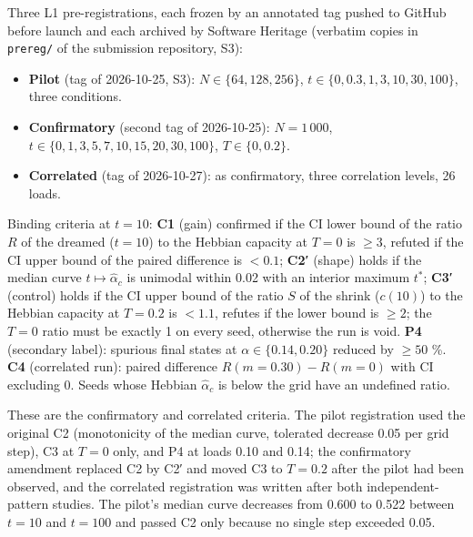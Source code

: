 Three L1 pre-registrations, each frozen by an annotated tag pushed to
GitHub before launch and each archived by Software Heritage (verbatim
copies in \texttt{prereg/} of the submission repository, S3):

\begin{itemize}
\tightlist
\item
  \textbf{Pilot} (tag of 2026-10-25, S3): \(N \in \{64, 128,
  256\}\), \(t \in \{0, 0.3, 1, 3, 10, 30, 100\}\), three conditions.
\item
  \textbf{Confirmatory} (second tag of 2026-10-25): \(N = 1\,000\),
  \(t \in \{0,\allowbreak 1,\allowbreak 3,\allowbreak 5,\allowbreak 7,\allowbreak 10,\allowbreak 15,\allowbreak 20,\allowbreak 30,\allowbreak 100\}\),
  \(T \in \{0, 0.2\}\).
\item
  \textbf{Correlated} (tag of 2026-10-27): as confirmatory, three
  correlation levels, 26 loads.
\end{itemize}

Binding criteria at \(t = 10\): \textbf{C1} (gain) confirmed if the CI
lower bound of the ratio \(R\) of the dreamed (\(t = 10\)) to the
Hebbian capacity at \(T = 0\) is \(\ge 3\), refuted if the CI upper
bound of the paired difference is \(< 0.1\); \textbf{C2′} (shape) holds
if the median curve \(t \mapsto \hat\alpha_c\) is unimodal within 0.02
with an interior maximum \(t^*\); \textbf{C3′} (control) holds if the CI
upper bound of the ratio \(S\) of the shrink (\(c(10)\)) to the Hebbian
capacity at \(T = 0.2\) is \(< 1.1\), refutes if the lower bound is
\(\ge 2\); the \(T = 0\) ratio must be exactly 1 on every seed,
otherwise the run is void. \textbf{P4} (secondary label): spurious final
states at \(\alpha \in \{0.14, 0.20\}\) reduced by \(\ge 50\) \%.
\textbf{C4} (correlated run): paired difference
\(R(m = 0.30) - R(m = 0)\) with CI excluding 0. Seeds whose Hebbian
\(\hat\alpha_c\) is below the grid have an undefined ratio.

These are the confirmatory and correlated criteria. The pilot
registration used the original C2 (monotonicity of the median curve,
tolerated decrease 0.05 per grid step), C3 at \(T = 0\) only, and P4 at
loads 0.10 and 0.14; the confirmatory amendment replaced C2 by C2′ and
moved C3 to \(T = 0.2\) after the pilot had been observed, and the
correlated registration was written after both independent-pattern
studies. The pilot's median curve decreases from 0.600 to 0.522 between
\(t = 10\) and \(t = 100\) and passed C2 only because no single step
exceeded 0.05.

